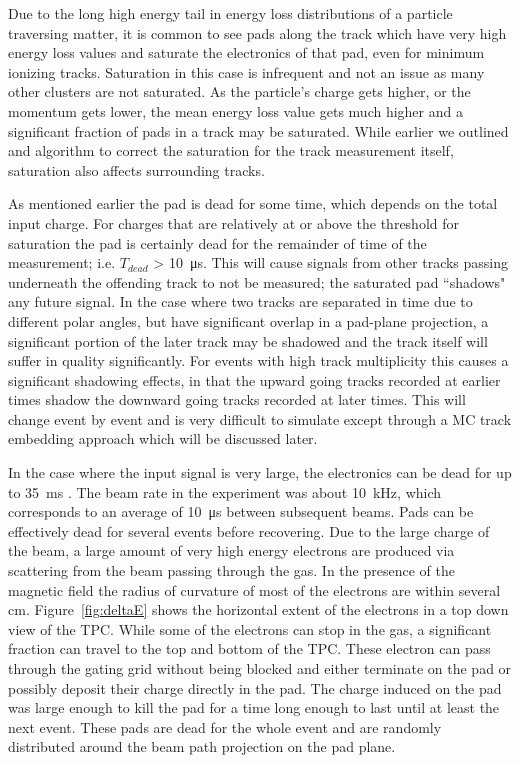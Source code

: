 Due to the long high energy tail in energy loss distributions of a particle traversing matter, it is common to see pads along the track which have very high energy loss values and saturate the electronics of that pad, even for minimum ionizing tracks. Saturation in this case is infrequent and not an issue as many other clusters are not saturated. As the particle's charge gets higher, or the momentum gets lower, the mean energy loss value gets much higher and a significant fraction of pads in a track may be saturated. While earlier we outlined and algorithm to correct the saturation for the track measurement itself, saturation also affects surrounding tracks. 

As mentioned earlier the pad is dead for some time, which depends on the total input charge. For charges that are relatively at or above the threshold for saturation the pad is certainly dead for the remainder of time of the measurement; i.e. $T_{dead}$ > \SI{10}{\micro\second}. This will cause signals from other tracks passing underneath the offending track to not be measured; the saturated pad ``shadows" any future signal. In the case where two tracks are separated in time due to different polar angles, but have significant overlap in a pad-plane projection, a significant portion of the later track may be shadowed and the track itself will suffer in quality significantly. For events with high track multiplicity this causes a significant shadowing effects, in that the upward going tracks recorded at earlier times shadow the downward going tracks recorded at later times. This will change event by event and is very difficult to simulate except through a MC track embedding approach which will be discussed later. 

In the case where the input signal is very large, the electronics can be dead for up to \SI{35}{\milli\second} \cite{akiGET}. The beam rate in the experiment was about \SI{10}{\kilo\hertz}, which corresponds to an average of \SI{10}{\micro\second} between subsequent beams. Pads can be effectively dead for several events before recovering. Due to the large charge of the beam, a large amount of very high energy electrons are produced via scattering from the beam passing through the gas. In the presence of the magnetic field the radius of curvature of most of the electrons are within several \si{cm}. Figure~\ref{fig:deltaE} shows the horizontal extent of the electrons in a top down view of the TPC. While some of the electrons can stop in the gas, a significant fraction can travel to the top and bottom of the TPC. These electron can pass through the gating grid without being blocked and either terminate on the pad or possibly deposit their charge directly in the pad. The charge induced on the pad was large enough to kill the pad for a time long enough to last until at least the next event. These pads are dead for the whole event and are randomly distributed around the beam path projection on the pad plane. 




